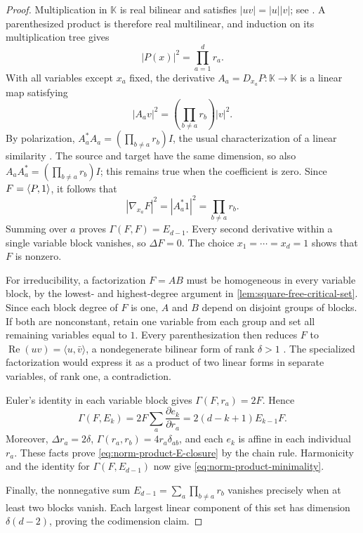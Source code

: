 \begin{proof}
Multiplication in \(\mathbb K\) is real bilinear and satisfies
\(|uv|=|u||v|\); see
\cite[Chapter~1, Appendix, pp.~21--22]{Shapiro2000}.
A parenthesized product is therefore real
multilinear, and induction on its multiplication tree gives
\[
 |P(x)|^2=\prod_{a=1}^d r_a.
\]
With all variables except \(x_a\) fixed, the derivative
\(A_a=D_{x_a}P:\mathbb K\to\mathbb K\) is a linear map satisfying
\[
 |A_av|^2=\left(\prod_{b\ne a}r_b\right)|v|^2.
\]
By polarization, \(A_a^*A_a=(\prod_{b\ne a}r_b)I\), the usual
characterization of a linear similarity
\cite[Chapter~1, Lemma~1.3(1), pp.~15--16]{Shapiro2000}.
The source and target have the same dimension, so also
\(A_aA_a^*=(\prod_{b\ne a}r_b)I\); this remains true when the
coefficient is zero.  Since \(F=\langle P,1\rangle\), it follows that
\[
 |\nabla_{x_a}F|^2=|A_a^*1|^2=\prod_{b\ne a}r_b.
\]
Summing over \(a\) proves \(\Gamma(F,F)=E_{d-1}\).
Every second derivative within a single variable block vanishes,
so \(\Delta F=0\).  The choice \(x_1=\cdots=x_d=1\) shows that
\(F\) is nonzero.

For irreducibility, a factorization \(F=AB\) must be homogeneous
in every variable block, by the lowest- and highest-degree argument
in \cref{lem:square-free-critical-set}. Since each block degree of
\(F\) is one, \(A\) and \(B\) depend on disjoint groups of blocks.
If both are nonconstant, retain one variable from each group and set
all remaining variables equal to \(1\). Every parenthesization then
reduces \(F\) to \(\operatorname{Re}(uv)=\langle u,\bar v\rangle\),
a nondegenerate bilinear form of rank \(\delta>1\)
\cite[Chapter~1, Appendix, pp.~21--22]{Shapiro2000}.
The specialized factorization would express it as a product of two
linear forms in separate variables, of rank one, a contradiction.

Euler's identity in each variable block gives
\(\Gamma(F,r_a)=2F\).  Hence
\[
 \Gamma(F,E_k)=2F\sum_a\frac{\partial e_k}{\partial r_a}
 =2(d-k+1)E_{k-1}F.
\]
Moreover, \(\Delta r_a=2\delta\),
\(\Gamma(r_a,r_b)=4r_a\delta_{ab}\), and each \(e_k\) is affine
in each individual \(r_a\).  These facts prove
\eqref{eq:norm-product-E-closure} by the chain rule.
Harmonicity and the identity for \(\Gamma(F,E_{d-1})\) now give
\eqref{eq:norm-product-minimality}.

Finally, the nonnegative sum
\(E_{d-1}=\sum_a\prod_{b\ne a}r_b\) vanishes precisely when at
least two blocks vanish.  Each largest linear component of this
set has dimension \(\delta(d-2)\), proving the codimension claim.
\end{proof}

